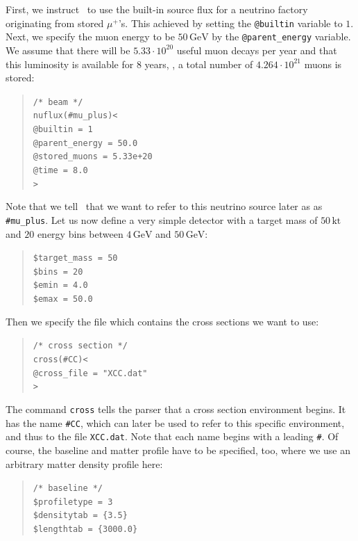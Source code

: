 %
First, we instruct \GLOBES\ to use the built-in source flux for a neutrino factory
originating from stored $\mu^+$'s. This achieved by setting the {\tt @builtin} variable to $1$. Next, we specify the muon energy to be $50\,\mathrm{GeV}$ by the {\tt @parent\_energy} variable. We assume 
that there will be $5.33\cdot 10^{20}$ useful muon decays per year
and that this luminosity is available for $8$ years, \ie , a total number
of $ 4.264\cdot10^{21}$ muons is stored:
\begin{quote}
{\tt /* beam */}\\
{\tt nuflux(\#mu\_plus)<\\
\tb  @builtin = 1\\
\tb  @parent\_energy = 50.0\\
\tb  @stored\_muons = 5.33e+20\\
\tb  @time = 8.0\\
>}\\
\end{quote}
Note that we tell \GLOBES\ that we want to refer to this neutrino source later as as {\tt \#mu\_plus}. 
%
Let us now define a very simple detector with a target mass 
of $50\,\mathrm{kt}$ and $20$ energy bins between
$4\,\mathrm{GeV}$ and $50\,\mathrm{GeV}$: 
\begin{quote}
{\tt \$target\_mass = 50}\\
{\tt \$bins = 20}\\
{\tt \$emin = 4.0}\\
{\tt \$emax = 50.0}
\end{quote}
Then we specify the file which contains the cross sections we want to 
use:
\begin{quote}
{\tt /* cross section */}\\
{\tt cross(\#CC)<}\\
{\tt \tb @cross\_file = "XCC.dat"}\\
{\tt >}
\end{quote}
The command {\tt cross} tells the parser that a cross section environment
begins. It has the name {\tt \#CC}, which can later be used to refer 
to this specific environment, and thus to the file {\tt XCC.dat}. Note that each name begins with a leading {\tt \#}.
%
Of course, the baseline and matter profile have to be specified, too, where
we use an arbitrary matter density profile here:
\begin{quote}
{\tt /* baseline */}\\
{\tt \$profiletype = 3}\\
{\tt \$densitytab = \{3.5\}}\\
{\tt \$lengthtab = \{3000.0\}}\\
\end{quote}
